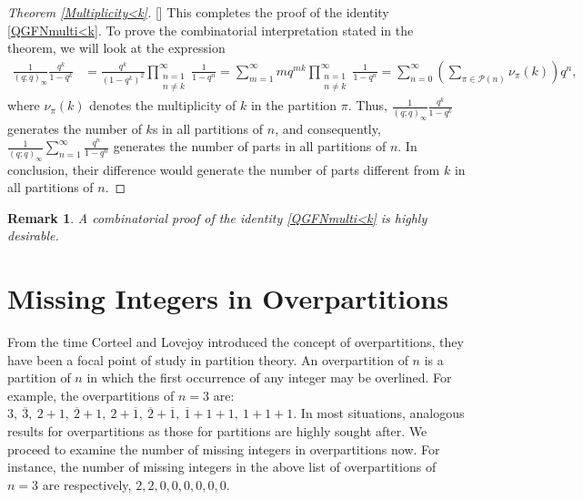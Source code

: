 \documentclass[12pt,reqno]{amsart}
\renewcommand{\(}{\left\(}
\renewcommand{\)}{\right\)}
\renewcommand{\[}{\left\[}
\renewcommand{\]}{\right\]}
\numberwithin{equation}{section}
\theoremstyle{plain}
\newtheorem{remark}[]{Remark}
\begin{document}
\begin{proof}[Theorem \textup{\ref{Multiplicity<k}}][]
This completes the proof of the identity \eqref{QGFNmulti<k}. To prove the combinatorial interpretation stated in the theorem, we will look at the expression
\begin{align*}
 \frac{1}{(q;q)_{\infty}}\frac{q^k}{1 - q^k} &= \frac{q^k}{(1 - q^k)^2}\prod_{\substack{n=1\\ n \neq k}}^{\infty} \frac{1}{1 - q^n} = \sum_{m=1}^{\infty} mq^{mk}\prod_{\substack{n=1\\ n \neq k}}^{\infty} \frac{1}{1 - q^n} = \sum_{n=0}^{\infty}\left(\sum_{\pi \in \mathcal{P}(n)} \nu_{\pi}(k)\right) q^n,
\end{align*}
where $\nu_{\pi}(k)$ denotes the multiplicity of $k$ in the partition $\pi$. Thus, $ \frac{1}{(q;q)_{\infty}}\frac{q^k}{1 - q^k}$ generates the number of $k$s in all partitions of $n$, and consequently, $\frac{1}{(q;q)_{\infty}}\sum_{n=1}^{\infty} \frac{q^n}{1 - q^n}$ generates the number of parts in all partitions of $n$. In conclusion, their difference would generate the number of parts different from $k$ in all partitions of $n$.
\end{proof}
\begin{remark}
A combinatorial proof of the identity \eqref{QGFNmulti<k} is highly desirable.
\end{remark}

\section{Missing Integers in Overpartitions}
From the time Corteel and Lovejoy \cite{overp} introduced the concept of overpartitions, they have been a focal point of study in partition theory. An overpartition of $n$ is a partition of $n$ in which the first occurrence of any integer may be overlined. For example, the overpartitions of $n=3$ are: $3, \ \overline{3}, \ 2+1, \ \overline{2}+1, \ 2+\overline{1}, \ \overline{2}+\overline{1}, \ \overline{1}+1+1, \ 1+1+1$. In most situations, analogous results for overpartitions as those for partitions are highly sought after. We proceed to examine the number of missing integers in overpartitions now. For instance, the number of missing integers in the above list of overpartitions of $n=3$ are respectively, $2, 2, 0, 0, 0, 0, 0, 0$.
\end{document}
